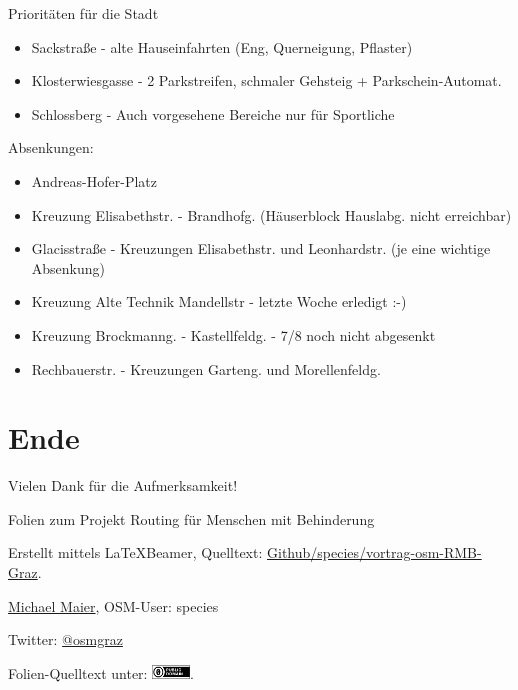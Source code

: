 \documentclass{beamer}
\begin{document}
\begin{frame}{Prioritäten für die Stadt}

      \begin{itemize}
        \item Sackstraße - alte Hauseinfahrten (Eng, Querneigung, Pflaster)
        \item Klosterwiesgasse - 2 Parkstreifen, schmaler Gehsteig + Parkschein-Automat.
        \item Schlossberg - Auch vorgesehene Bereiche nur für Sportliche
      \end{itemize}

      \pause

   Absenkungen:
      \begin{itemize}
        \item Andreas-Hofer-Platz
        \item Kreuzung Elisabethstr. - Brandhofg. (Häuserblock Hauslabg. nicht erreichbar)
        \item Glacisstraße - Kreuzungen Elisabethstr. und Leonhardstr. (je eine wichtige Absenkung)
        \item Kreuzung Alte Technik Mandellstr - letzte Woche erledigt :-)
        \item Kreuzung Brockmanng. - Kastellfeldg. - 7/8 noch nicht abgesenkt
        \item Rechbauerstr. - Kreuzungen Garteng. und Morellenfeldg.
      \end{itemize}

\end{frame}


\section{Ende}

\begin{frame}{Vielen Dank für die Aufmerksamkeit!}

  Folien zum Projekt Routing für Menschen mit Behinderung
\vspace{1cm}

Erstellt mittels \LaTeX Beamer, Quelltext: \href{https://github.com/species/vortrag-osm-RMB-Graz}{Github/species/vortrag-osm-RMB-Graz}.
\vspace{1cm}

\href{mailto:Michael.Maier@student.tugraz.at}{Michael Maier}, OSM-User: species

Twitter: \href{https://twitter.com/osmgraz}{@osmgraz}
\vspace{1cm}

Folien-Quelltext unter: \includegraphics[width=1cm]{cc-zero.pdf}. 

\end{frame}
\end{document}
